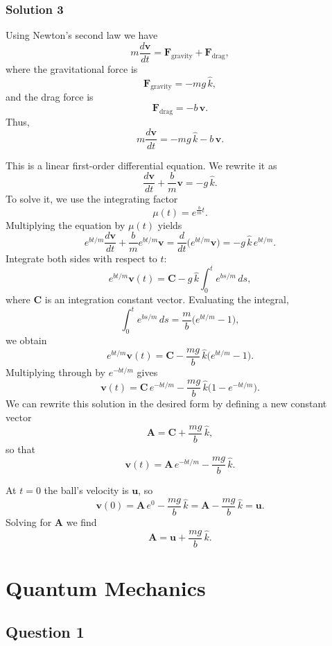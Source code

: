 \documentclass{article}
\begin{document}
\subsubsection{Solution 3}
Using Newton’s second law we have
\[
m\frac{d\mathbf{v}}{dt} = \mathbf{F}_{\text{gravity}} + \mathbf{F}_{\text{drag}},
\]
where the gravitational force is 
\[
\mathbf{F}_{\text{gravity}} = -mg\,\hat{k},
\]
and the drag force is 
\[
\mathbf{F}_{\text{drag}} = -b\,\mathbf{v}.
\]
Thus,
\[
m\frac{d\mathbf{v}}{dt} = -mg\,\hat{k} - b\,\mathbf{v}.
\]

This is a linear first-order differential equation. We rewrite it as
\[
\frac{d\mathbf{v}}{dt} + \frac{b}{m}\mathbf{v} = -g\,\hat{k}.
\]
To solve it, we use the integrating factor
\[
\mu(t)= e^{\frac{b}{m}t}.
\]
Multiplying the equation by \(\mu(t)\) yields
\[
e^{bt/m}\frac{d\mathbf{v}}{dt} + \frac{b}{m}e^{bt/m}\mathbf{v} = \frac{d}{dt}\Big(e^{bt/m}\mathbf{v}\Big) = -g\,\hat{k}\,e^{bt/m}.
\]
Integrate both sides with respect to \(t\):
\[
e^{bt/m}\mathbf{v}(t) = \mathbf{C} - g\,\hat{k}\int_0^t e^{bs/m}\,ds,
\]
where \(\mathbf{C}\) is an integration constant vector. Evaluating the integral,
\[
\int_0^t e^{bs/m}\,ds = \frac{m}{b}\Big(e^{bt/m}-1\Big),
\]
we obtain
\[
e^{bt/m}\mathbf{v}(t) = \mathbf{C} - \frac{mg}{b}\,\hat{k}\Big(e^{bt/m}-1\Big).
\]
Multiplying through by \(e^{-bt/m}\) gives
\[
\mathbf{v}(t) = \mathbf{C}\,e^{-bt/m} - \frac{mg}{b}\,\hat{k}\Big(1 - e^{-bt/m}\Big).
\]
We can rewrite this solution in the desired form by defining a new constant vector
\[
\mathbf{A} = \mathbf{C} + \frac{mg}{b}\,\hat{k},
\]
so that
\[
\mathbf{v}(t) = \mathbf{A}\,e^{-bt/m} - \frac{mg}{b}\,\hat{k}.
\]

At \(t=0\) the ball’s velocity is \(\mathbf{u}\), so
\[
\mathbf{v}(0)=\mathbf{A}\,e^0 - \frac{mg}{b}\,\hat{k} = \mathbf{A} - \frac{mg}{b}\,\hat{k} = \mathbf{u}.
\]
Solving for \(\mathbf{A}\) we find
\[
\mathbf{A} = \mathbf{u} + \frac{mg}{b}\,\hat{k}.
\]





\section{Quantum Mechanics}

\subsection{Question 1}
\end{document}
